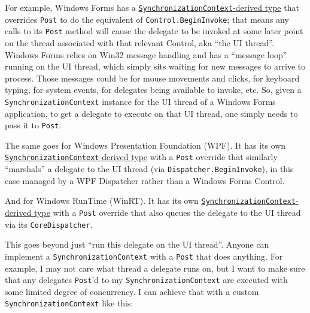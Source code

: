 \documentclass[a4paper,12pt,notitlepage,twoside,openright]{article}
\begin{document}
For example, Windows Forms has a
\href{https://github.com/dotnet/winforms/blob/94ce4a2e52bf5d0d07d3d067297d60c8a17dc6b4/src/System.Windows.Forms/src/System/Windows/Forms/WindowsFormsSynchronizationContext.cs}{\texttt{SynchronizationContext}-derived
type} that overrides \texttt{Post} to do the equivalent of
\texttt{Control.BeginInvoke}; that means any calls to its \texttt{Post}
method will cause the delegate to be invoked at some later point on the
thread associated with that relevant Control, aka ``the UI thread''.
Windows Forms relies on Win32 message handling and has a ``message
loop'' running on the UI thread, which simply sits waiting for new
messages to arrive to process. Those messages could be for mouse
movements and clicks, for keyboard typing, for system events, for
delegates being available to invoke, etc. So, given a
\texttt{SynchronizationContext} instance for the UI thread of a Windows
Forms application, to get a delegate to execute on that UI thread, one
simply needs to pass it to \texttt{Post}.

The same goes for Windows Presentation Foundation (WPF). It has its own
\href{https://github.com/dotnet/wpf/blob/ac9d1b7a6b0ee7c44fd2875a1174b820b3940619/src/Microsoft.DotNet.Wpf/src/WindowsBase/System/Windows/Threading/DispatcherSynchronizationContext.cs}{\texttt{SynchronizationContext}-derived
type} with a \texttt{Post} override that similarly ``marshals'' a
delegate to the UI thread (via \texttt{Dispatcher.BeginInvoke}), in this
case managed by a WPF Dispatcher rather than a Windows Forms Control.

And for Windows RunTime (WinRT). It has its own
\href{https://github.com/dotnet/runtime/blob/60d1224ddd68d8ac0320f439bb60ac1f0e9cdb27/src/libraries/System.Runtime.WindowsRuntime/src/System/Threading/WindowsRuntimeSynchronizationContext.cs}{\texttt{SynchronizationContext}-derived
type} with a \texttt{Post} override that also queues the delegate to the
UI thread via its \texttt{CoreDispatcher}.

This goes beyond just ``run this delegate on the UI thread''. Anyone can
implement a \texttt{SynchronizationContext} with a \texttt{Post} that
does anything. For example, I may not care what thread a delegate runs
on, but I want to make sure that any delegates \texttt{Post}'d to my
\texttt{SynchronizationContext} are executed with some limited degree of
concurrency. I can achieve that with a custom
\texttt{SynchronizationContext} like this:
\end{document}
